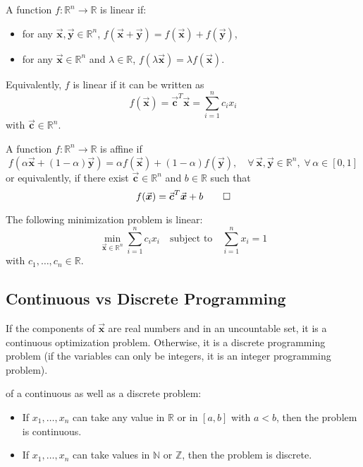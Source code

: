 \documentclass[9pt, headings=standardclasses, parskip=half]{scrartcl}
\renewcommand{\emph}[1]{\textcolor{mypurple}{#1}}
\newcommand{\vect}[1]{\vec{\boldsymbol{#1}}}
\begin{document}
\begin{definition}
A function \(f:\mathbb{R}^{n}\rightarrow\mathbb{R}\) is \emph{linear} if:
\begin{itemize}
	\item for any \(\vect{x},\vect{y}\in\mathbb{R}^{n}\), \(f(\vect{x}+\vect{y})=f(\vect{x})+f(\vect{y})\),
	\item for any \(\vect{x}\in\mathbb{R}^{n}\) and \(\lambda\in\mathbb{R}\), \(f(\lambda\vect{x})=\lambda f(\vect{x})\).
\end{itemize}
Equivalently, \(f\) is linear if it can be written as
\[
f(\vect{x})=\vect{c}^{T}\vect{x}=\sum_{i=1}^{n} c_{i}x_{i}
\]
with \(\vect{c}\in\mathbb{R}^{n}\).
\end{definition}

\begin{definition}\label{def:affine_function}
A function \(f:\mathbb{R}^{n}\rightarrow\mathbb{R}\) is \emph{affine} if
\[
f(\alpha\vect{x}+(1-\alpha)\vect{y})=\alpha f(\vect{x})+(1-\alpha)f(\vect{y}),\quad \forall\, \vect{x},\vect{y}\in\mathbb{R}^{n},\; \forall\, \alpha\in[0,1]
\]
or equivalently, if there exist \(\vect{c}\in\mathbb{R}^{n}\) and \(b\in\mathbb{R}\) such that
\[
f(\vect{x})=\vect{c}^{T}\vect{x}+b\qedhere
\]
\end{definition}

\begin{example}
The following minimization problem is linear:
\[
\min_{\vect{x}\in\mathbb{R}^{n}} \sum_{i=1}^{n} c_{i}x_{i} \quad \text{subject to} \quad \sum_{i=1}^{n} x_{i}=1
\]
with \(c_{1}, \ldots, c_{n}\in\mathbb{R}\).
\end{example}

\subsection{Continuous vs Discrete Programming}

If the components of \(\vect{x}\) are real numbers and in an uncountable set, it is a \emph{continuous} optimization problem. Otherwise, it is a \emph{discrete} programming problem (if the variables can only be integers, it is an \emph{integer} programming problem).

\begin{example}
of a continuous as well as a discrete problem:
\begin{itemize}
	\item If \(x_{1},\ldots, x_{n}\) can take any value in \(\mathbb{R}\) or in \([a,b]\) with \(a<b\), then the problem is continuous.
	\item If \(x_{1},\ldots, x_{n}\) can take values in \(\mathbb{N}\) or \(\mathbb{Z}\), then the problem is discrete.\qedhere
\end{itemize}
\end{example}
\end{document}

